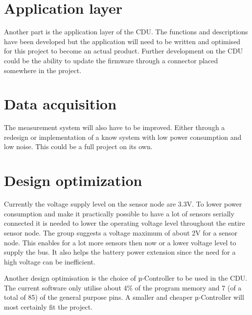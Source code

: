 \section{Application layer}
Another part is the application layer of the CDU. The functions and descriptions have been developed but the application will need to be written and optimised for this project to become an actual product. Further development on the CDU could be the ability to update the firmware through a connector placed somewhere in the project.

\section{Data acquisition}
The measurement system will also have to be improved. Either through a redesign or implementation of a know system with low power consumption and low noise. This could be a full project on its own.

\section{Design optimization}
\label{sec:DO}
Currently the voltage supply level on the sensor node are 3.3V. To lower power consumption and make it practically possible to have a lot of sensors serially connected it is needed to lower the operating voltage level throughout the entire sensor node. The group suggests a voltage maximum of about 2V for a sensor node. This enables for a lot more sensors then now or a lower voltage level to supply the bus. It also helps the battery power extension since the need for a high voltage can be inefficient.

Another design optimisation is the choice of µ-Controller to be used in the CDU. The current software only utilise about 4\% of the program memory and 7 (of a total of 85) of the general purpose pins. A smaller and cheaper µ-Controller will most certainly fit the project.